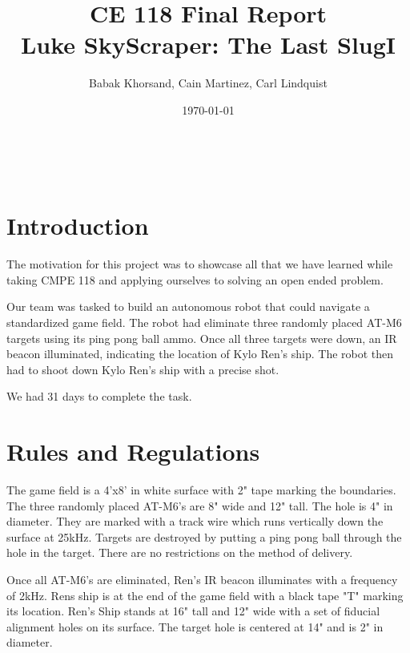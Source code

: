 \documentclass[]{article}
\begin{document}

\title{%
	CE 118 Final Report \\ 
    \large \vspace{3mm} Luke SkyScraper: The Last SlugI}
\author{Babak Khorsand, Cain Martinez, Carl Lindquist}
\date{\today}		%
\maketitle
\(\)


\section*{Introduction}
The motivation for this project was to showcase all that we have learned while taking CMPE 118 and applying ourselves to solving an open ended problem. 

Our team was tasked to build an autonomous robot that could navigate a standardized game field. The robot had eliminate three randomly placed AT-M6 targets using its ping pong ball ammo. Once all three targets were down, an IR beacon illuminated, indicating the location of Kylo Ren's ship. The robot then had to shoot down Kylo Ren's ship with a precise shot.

We had 31 days to complete the task.

\section*{Rules and Regulations}
The game field is a 4'x8' in white surface with 2" tape marking the boundaries. The three randomly placed AT-M6's are 8" wide and 12" tall. The hole is 4" in diameter. They are marked with a track wire which runs vertically down the surface at 25kHz. Targets are destroyed by putting a ping pong ball through the hole in the target. There are no restrictions on the method of delivery.

Once all AT-M6's are eliminated, Ren's IR beacon illuminates with a frequency of 2kHz. Rens ship is at the end of the game field with a black tape "T" marking its location. Ren's Ship stands at 16" tall and 12" wide with a set of fiducial alignment holes on its surface. The target hole is centered at 14" and is 2" in diameter.
\end{document}
